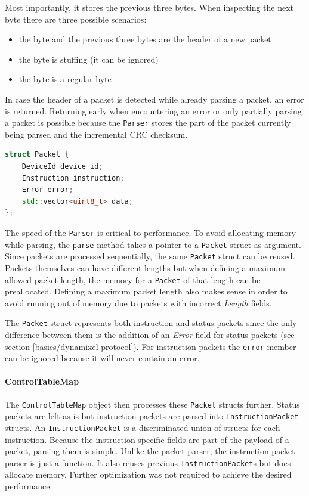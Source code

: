 Most importantly, it stores the previous three bytes. When inspecting the next byte there are three
possible scenarios:

\begin{itemize}
    \item the byte and the previous three bytes are the header of a new packet
    \item the byte is stuffing (it can be ignored)
    \item the byte is a regular byte
\end{itemize}

In case the header of a packet is detected while already parsing a packet, an error is returned.
Returning early when encountering an error or only partially parsing a packet is possible because
the \lstinline{Parser} stores the part of the packet currently being parsed and the incremental
CRC checksum.

\begin{lstlisting}[language=C++, caption={Definition of the \lstinline{Packet} struct}]
struct Packet {
    DeviceId device_id;
    Instruction instruction;
    Error error;
    std::vector<uint8_t> data;
};
\end{lstlisting}

The speed of the \lstinline{Parser} is critical to performance. To avoid allocating memory while
parsing, the \lstinline{parse} method takes a pointer to a \lstinline{Packet} struct as argument.
Since packets are processed sequentially, the same \lstinline{Packet} struct can be reused. Packets
themselves can have different lengths but when defining a maximum allowed packet length, the memory
for a \lstinline{Packet} of that length can be preallocated. Defining a maximum packet length also
makes sense in order to avoid running out of memory due to packets with incorrect \textit{Length}
fields.

The \lstinline{Packet} struct represents both instruction and status packets since the only difference
between them is the addition of an \textit{Error} field for status packets (see section
\ref{basics/dynamixel-protocol}). For instruction packets the \lstinline{error} member can be ignored
because it will never contain an error.

\paragraph{ControlTableMap}

The \lstinline{ControlTableMap} object then processes these \lstinline{Packet} structs further.
Status packets are left as is but instruction packets are parsed into \lstinline{InstructionPacket}
structs. An \lstinline{InstructionPacket} is a discriminated union of structs for each instruction.
Because the instruction specific fields are part of the payload of a packet, parsing them is simple.
Unlike the packet parser, the instruction packet parser is just a function. It also reuses previous
\lstinline{InstructionPacket}s but does allocate memory. Further optimization was not required to
achieve the desired performance.

